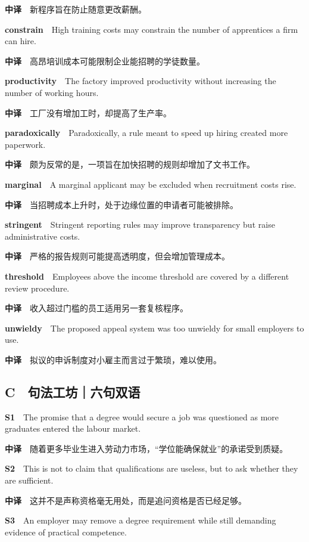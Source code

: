 \documentclass[
  11pt,
]{ctexart}
\begin{document}
\textbf{中译}　新程序旨在防止随意更改薪酬。

\textbf{constrain}　High training costs may constrain the number of
apprentices a firm can hire.

\textbf{中译}　高昂培训成本可能限制企业能招聘的学徒数量。

\textbf{productivity}　The factory improved productivity without
increasing the number of working hours.

\textbf{中译}　工厂没有增加工时，却提高了生产率。

\textbf{paradoxically}　Paradoxically, a rule meant to speed up hiring
created more paperwork.

\textbf{中译}　颇为反常的是，一项旨在加快招聘的规则却增加了文书工作。

\textbf{marginal}　A marginal applicant may be excluded when recruitment
costs rise.

\textbf{中译}　当招聘成本上升时，处于边缘位置的申请者可能被排除。

\textbf{stringent}　Stringent reporting rules may improve transparency
but raise administrative costs.

\textbf{中译}　严格的报告规则可能提高透明度，但会增加管理成本。

\textbf{threshold}　Employees above the income threshold are covered by
a different review procedure.

\textbf{中译}　收入超过门槛的员工适用另一套复核程序。

\textbf{unwieldy}　The proposed appeal system was too unwieldy for small
employers to use.

\textbf{中译}　拟议的申诉制度对小雇主而言过于繁琐，难以使用。

\subsection{C　句法工坊｜六句双语}\label{c-ux53e5ux6cd5ux5de5ux574aux516dux53e5ux53ccux8bed}

\textbf{S1}　The promise that a degree would secure a job was questioned
as more graduates entered the labour market.

\textbf{中译}　随着更多毕业生进入劳动力市场，``学位能确保就业''的承诺受到质疑。

\textbf{S2}　This is not to claim that qualifications are useless, but
to ask whether they are sufficient.

\textbf{中译}　这并不是声称资格毫无用处，而是追问资格是否已经足够。

\textbf{S3}　An employer may remove a degree requirement while still
demanding evidence of practical competence.
\end{document}
